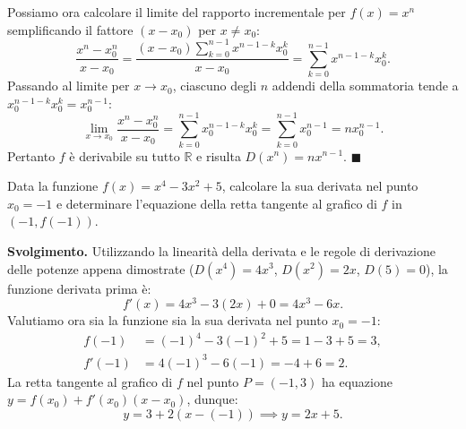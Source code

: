 \begin{itemize}
    Possiamo ora calcolare il limite del rapporto incrementale per $f(x) = x^n$ semplificando il fattore $(x - x_0)$ per $x \neq x_0$:
    \[
        \frac{x^n - x_0^n}{x - x_0} = \frac{(x - x_0) \displaystyle\sum_{k=0}^{n-1} x^{n-1-k} x_0^k}{x - x_0} = \sum_{k=0}^{n-1} x^{n-1-k} x_0^k.
    \]
    Passando al limite per $x \to x_0$, ciascuno degli $n$ addendi della sommatoria tende a $x_0^{n-1-k} x_0^k = x_0^{n-1}$:
    \[
        \lim_{x \to x_0} \frac{x^n - x_0^n}{x - x_0} = \sum_{k=0}^{n-1} x_0^{n-1-k} x_0^k = \sum_{k=0}^{n-1} x_0^{n-1} = n x_0^{n-1}.
    \]
    Pertanto $f$ è derivabile su tutto $\mathbb{R}$ e risulta $D(x^n) = n x^{n-1}$. $\blacksquare$
\end{itemize}

\begin{esbox}
Data la funzione $f(x) = x^4 - 3x^2 + 5$, calcolare la sua derivata nel punto $x_0 = -1$ e determinare l'equazione della retta tangente al grafico di $f$ in $(-1, f(-1))$.

\medskip
\noindent\textbf{Svolgimento.}
Utilizzando la linearità della derivata e le regole di derivazione delle potenze appena dimostrate ($D(x^4) = 4x^3$, $D(x^2) = 2x$, $D(5) = 0$), la funzione derivata prima è:
\[
    f'(x) = 4x^3 - 3(2x) + 0 = 4x^3 - 6x.
\]
Valutiamo ora sia la funzione sia la sua derivata nel punto $x_0 = -1$:
\begin{align*}
    f(-1) &= (-1)^4 - 3(-1)^2 + 5 = 1 - 3 + 5 = 3, \\
    f'(-1) &= 4(-1)^3 - 6(-1) = -4 + 6 = 2.
\end{align*}
La retta tangente al grafico di $f$ nel punto $P = (-1, 3)$ ha equazione $y = f(x_0) + f'(x_0)(x - x_0)$, dunque:
\[
    y = 3 + 2(x - (-1)) \implies y = 2x + 5.
\]
\end{esbox}

